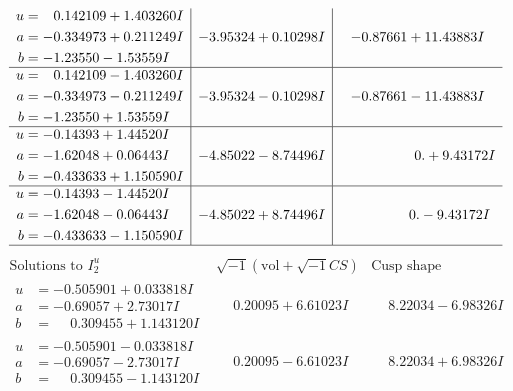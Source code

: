 \documentclass[1p]{elsarticle_modified}
\theoremstyle{definition}
\newcommand{\I}{\sqrt{-1}}
\begin{document}
$$\begin{array}{c|c|c}
\begin{aligned}
u &= \phantom{-}0.142109 + 1.403260 I \\
a &= -0.334973 + 0.211249 I \\
b &= -1.23550 - 1.53559 I\end{aligned}
 & -3.95324 + 0.10298 I & -0.87661 + 11.43883 I \\ \hline\begin{aligned}
u &= \phantom{-}0.142109 - 1.403260 I \\
a &= -0.334973 - 0.211249 I \\
b &= -1.23550 + 1.53559 I\end{aligned}
 & -3.95324 - 0.10298 I & -0.87661 - 11.43883 I \\ \hline\begin{aligned}
u &= -0.14393 + 1.44520 I \\
a &= -1.62048 + 0.06443 I \\
b &= -0.433633 + 1.150590 I\end{aligned}
 & -4.85022 - 8.74496 I & \phantom{-0.000000 -}0. + 9.43172 I \\ \hline\begin{aligned}
u &= -0.14393 - 1.44520 I \\
a &= -1.62048 - 0.06443 I \\
b &= -0.433633 - 1.150590 I\end{aligned}
 & -4.85022 + 8.74496 I & \phantom{-0.000000 } 0. - 9.43172 I\\
 \hline 
 \end{array}$$\newpage$$\begin{array}{c|c|c}  
\text{Solutions to }I^u_{2}& \I (\text{vol} + \sqrt{-1}CS) & \text{Cusp shape}\\
 \hline 
\begin{aligned}
u &= -0.505901 + 0.033818 I \\
a &= -0.69057 + 2.73017 I \\
b &= \phantom{-}0.309455 + 1.143120 I\end{aligned}
 & \phantom{-}0.20095 + 6.61023 I & \phantom{-}8.22034 - 6.98326 I \\ \hline\begin{aligned}
u &= -0.505901 - 0.033818 I \\
a &= -0.69057 - 2.73017 I \\
b &= \phantom{-}0.309455 - 1.143120 I\end{aligned}
 & \phantom{-}0.20095 - 6.61023 I & \phantom{-}8.22034 + 6.98326 I \\ \hline\begin{aligned}

\end{aligned}
\end{array}$$
\end{document}
